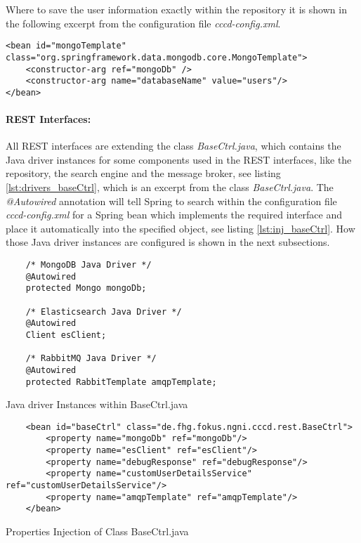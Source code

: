 Where to save the user information exactly within the repository it is shown in the following excerpt from the configuration file \textit{cccd-config.xml}.
\begin{code}
\begin{verbatim}
<bean id="mongoTemplate" class="org.springframework.data.mongodb.core.MongoTemplate">
	<constructor-arg ref="mongoDb" />
	<constructor-arg name="databaseName" value="users"/>
</bean>
\end{verbatim}
\end{code}

\paragraph{REST Interfaces:} All \ac{REST} interfaces are extending the class \textit{BaseCtrl.java}, which contains the Java driver instances for some components used in the \ac{REST} interfaces, like the repository, the search engine and the message broker, see listing \ref{lst:drivers_baseCtrl}, which is an excerpt from the class \textit{BaseCtrl.java}. The \textit{@Autowired} annotation will tell Spring to search within the configuration file \textit{cccd-config.xml} for a Spring bean which implements the required interface and place it automatically into the specified object, see listing \ref{lst:inj_baseCtrl}. How those Java driver instances are configured is shown in the next subsections.
\begin{code}
\begin{verbatim}
	/* MongoDB Java Driver */
	@Autowired
	protected Mongo mongoDb;
	
	/* Elasticsearch Java Driver */
	@Autowired
	Client esClient;
	
	/* RabbitMQ Java Driver */
	@Autowired
	protected RabbitTemplate amqpTemplate;
\end{verbatim}
\caption{Java driver Instances within BaseCtrl.java}
\label{lst:drivers_baseCtrl}
\end{code}

\begin{code}
\begin{verbatim}
	<bean id="baseCtrl" class="de.fhg.fokus.ngni.cccd.rest.BaseCtrl">
	   	<property name="mongoDb" ref="mongoDb"/>
	   	<property name="esClient" ref="esClient"/>
	   	<property name="debugResponse" ref="debugResponse"/>
	   	<property name="customUserDetailsService" ref="customUserDetailsService"/>
	   	<property name="amqpTemplate" ref="amqpTemplate"/>
	</bean>
\end{verbatim}
\caption{Properties Injection of Class BaseCtrl.java}
\label{lst:inj_baseCtrl}
\end{code}

